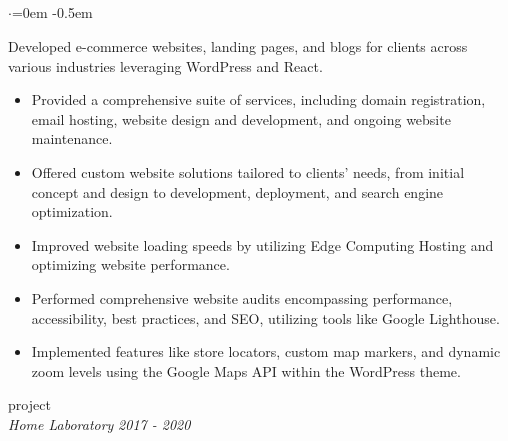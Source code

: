 \documentclass{article}
\begin{document}
\subsection*{}
\vspace{-2.6em}
\begin{list}{$\cdot$}{\leftmargin=0em} %
    \itemsep -0.5em \vspace{-0.5em} %
    \item Developed e-commerce websites, landing pages, and blogs for clients across various industries leveraging WordPress and React.
\end{list}
\vspace{-1.6em}
\begin{itemize}
    \item Provided a comprehensive suite of services, including domain registration, email hosting, website design and development, and ongoing website maintenance.
    \item Offered custom website solutions tailored to clients' needs, from initial concept and design to development, deployment, and search engine optimization.
    \item Improved website loading speeds  by utilizing Edge Computing Hosting and optimizing website performance.
    \item Performed comprehensive website audits encompassing performance, accessibility, best practices, and SEO, utilizing tools like Google Lighthouse.
    \item Implemented features like store locators, custom map markers, and dynamic zoom levels using the Google Maps API within the WordPress theme.
\end{itemize}


\hspace{-2.em}
{\bf}project  \hfill {} \\%
{\em Home Laboratory} \hfill {\em 2017 - 2020 } %
\end{document}
